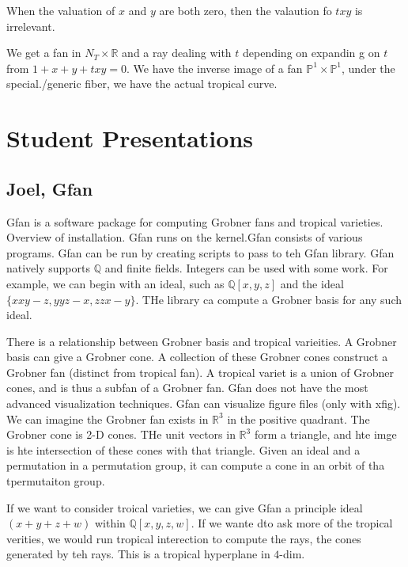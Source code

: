 \documentclass[11pt]{article}
\theoremstyle{definition}
\theoremstyle{plain}%
\theoremstyle{definition}
\def\QQ{{\mathbb Q}}
\def\RR{{\mathbb R}}
\def\PP{{\mathbb P}}
\begin{document}
When the valuation of $x$ and $y$ are both zero, then the valaution fo $txy$ is irrelevant.


We get a fan in $N_T \times \RR$ and a ray dealing with $t$ depending on expandin g on $t$ from $1+x+y+txy=0$. We have the inverse image of a fan $\PP^1 \times \PP^1$, under the special./generic fiber, we have the actual tropical curve.









\section{Student Presentations}

\subsection{Joel, Gfan }

Gfan is a software package for computing Grobner fans and tropical varieties. Overview of installation. Gfan runs on the kernel.Gfan consists of various programs. Gfan can be run by creating scripts to pass to teh Gfan library. Gfan natively supports $\QQ$ and finite fields. Integers can be used with some work. For example, we can begin with an ideal, such as $\QQ[x,y,z]$ and the ideal $\{xxy-z,yyz-x,zzx-y\}$. THe library ca compute a Grobner basis for any such ideal.

There is a relationship between Grobner basis and tropical varieities. A Grobner basis can give a Grobner cone. A collection of these Grobner cones construct a Grobner fan (distinct from tropical fan). A tropical variet is a union of Grobner cones, and is thus a subfan of a Grobner fan. Gfan does not have the most advanced visualization techniques. Gfan can visualize  figure files (only with xfig). We can imagine the Grobner fan exists in $\RR^3$ in the positive quadrant. The Grobner cone is 2-D cones. THe unit vectors in $\RR^3$ form a triangle, and hte imge is hte intersection of these cones with that triangle. Given an ideal and a permutation in a permutation group, it can compute a cone in an orbit of tha tpermutaiton group.

If we want to consider troical varieties, we can give Gfan a principle ideal $(x+y+z+w)$ within $\QQ[x,y,z,w]$. If we wante dto ask more of the tropical verities, we would run tropical interection to compute the rays, the cones generated by teh rays. This is a tropical hyperplane in $4$-dim.
\end{document}
